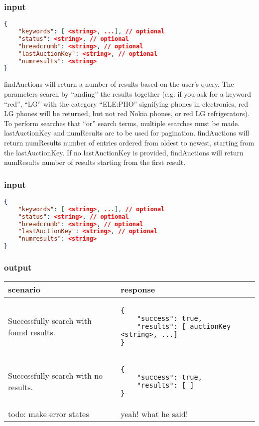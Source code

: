 \documentclass[12pt,a4paper]{article}
\begin{document}
\subsubsection{input}
\begin{lstlisting}[language=json,firstnumber=1]
{
    "keywords": [ <string>, ...], // optional
    "status": <string>, // optional
    "breadcrumb": <string>, // optional
    "lastAuctionKey": <string>, // optional
    "numresults": <string>
}
\end{lstlisting}

findAuctions will return a number of results based on the user's query. The
parameters search by ``anding'' the results together (e.g. if you ask for a
keyword ``red'', ``LG'' with the category ``ELE:PHO'' signifying phones in
electronics, red LG phones will be returned, but not red Nokia phones, or red
LG refrigerators). To perform searches that ``or'' search terms, multiple
searches must be made. lastAuctionKey and numResults are to be used for
pagination. findAuctions will return numResults number of entries ordered from
oldest to newest, starting from the lastAuctionKey. If no lastAuctionKey is
provided, findAuctions will return numResults number of results starting from
the first result.

\subsubsection{input}
\begin{lstlisting}[language=json,firstnumber=1]
{
    "keywords": [ <string>, ...], // optional
    "status": <string>, // optional
    "breadcrumb": <string>, // optional
    "lastAuctionKey": <string>, // optional
    "numresults": <string>
}
\end{lstlisting}

\subsubsection{output}
\begin{center}
    \begin{tabular}{| p{5cm} | l |}
        \hline
        \textbf{scenario} & \textbf{response} \\
        \hline
        Successfully search with found results. &
        \begin{lstlisting}[boxpos=t,language=tablejson,firstnumber=1]
{
    "success": true,
    "results": [ auctionKey <string>, ...]
}
        \end{lstlisting} \\ 
        \hline
 \hline
        Successfully search with no results. &
        \begin{lstlisting}[boxpos=t,language=tablejson,firstnumber=1]
{
    "success": true,
    "results": [ ]
}
        \end{lstlisting} \\ 
        \hline
            todo: make error states & yeah! what he said! \\
        \hline
    \end{tabular}
\end{center}
\end{document}
